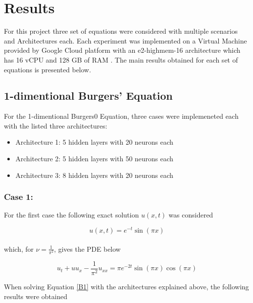 \documentclass[12pt,letterpaper]{article}
\begin{document}
\section{Results}

For this project three set of equations were considered with multiple scenarios and Architectures each. Each experiment was implemented on a Virtual Machine provided by Google Cloud platform with an e2-highmem-16 architecture which has 16 vCPU and 128 GB of RAM \cite{GCP}. The main results obtained for each set of equations is presented below.

\subsection{1-dimentional Burgers' Equation}

For the 1-dimentional Burgers0 Equation, three cases were implemeneted each with the listed three architectures:

\begin{itemize}
  \item Architecture 1: 5 hidden layers with 20 neurons each
  \item Architecture 2: 5 hidden layers with 50 neurons each
  \item Architecture 3: 8 hidden layers with 20 neurons each
\end{itemize}

\subsubsection*{Case 1:}

For the first case the following exact solution $u(x,t)$ was considered

$$u(x,t) = e^{-t}\sin(\pi x)$$\\

which, for $\nu=\frac{1}{\pi^2}$, gives the PDE below

\begin{equation}
  \label{B1}
  u_t + u u_x - \frac{1}{\pi^2}u_{xx} = \pi e^{-2t}\sin(\pi x)\cos(\pi x) 
\end{equation}

When solving Equation \ref{B1} with the architectures explained above, the following results were obtained
\end{document}
